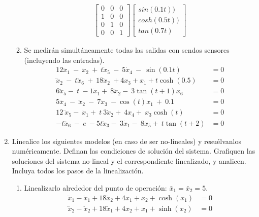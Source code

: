 \documentclass[letterpaper, 12pt]{article}
\begin{document}
\begin{enumerate}
\begin{enumerate}
\begin{multline*}
\begin{bmatrix}
0  &0  &0 \\
1  &0  &0 \\
0  &1  &0 \\
0  &0  &1 
\end{bmatrix}
\begin{bmatrix}
sin(0.1t))\\ 
cosh(0.5t))\\ 
tan(0.7t)
\end{bmatrix}
\end{multline*}









\item Se medirán simultáneamente todas las salidas con sendos sensores (incluyendo las entradas).
\begin{equation}
\begin{split}
    12{\dddot{x}}_1\ -\ {\ddot{x}}_2\ +\ t{\dot{x}}_5\ -\ 5{\dot{x}}_4\ -\ \sin(0.1t) &=0 \\
    \dddot{x}_2\ -\ t\ddot{x}_6\ +\ 18\dot{x}_2\ + 4x_3 + x_1 + t \cosh(0.5) &= 0 \\
    6{\ddot{x}}_5-\ t\ -1{\dot{x}}_1+\ 8{\ddot{x}}_2-\ 3\tan(t + 1)x_6 &= 0\\
    5{\dddot{x}}_4\ -\ {\ddot{x}}_2\ -\ 7{\ddot{x}}_3\ -\cos(t)x_1\ +\ 0.1 &= 0 \\ 
    12{\dddot{\ x}}_5-\ {\ddot{x}}_1+\ t\ 3{\dot{x}}_2+\ 4x_4+\ x_3\cosh(t) &=0 \\
    -t{\dddot{x}}_6\ -\ e\ -5t{\ddot{x}}_3-\ 3{\dot{x}}_1-\ 8x_5+\ t\tan(t + 2) &= 0
\end{split}
\end{equation}



\end{enumerate}
\item Linealice los siguientes modelos (en caso de ser no-lineales) y resuélvanlos numéricamente. Definan las condiciones de solución del sistema. Grafiquen las soluciones del sistema no-lineal y el
correspondiente linealizado, y analicen. Incluya todos los pasos de la linealización. 
\begin{enumerate}
\item Linealizarlo alrededor del punto de operación: $\bar{x}_1=\bar{x}_2=5$.
\begin{equation}
\begin{split}
    \dddot{x}_1-\ddot{x}_1+18\ddot{x}_2+4x_1+x_2+\cosh(x_1) &= 0 \\ \dddot{x}_2-\ddot{x}_2+18\ddot{x}_1+4x_2+x_1+\sinh(x_2) &= 0
\end{split}
\end{equation}


\end{enumerate}
\end{enumerate}
\end{document}
